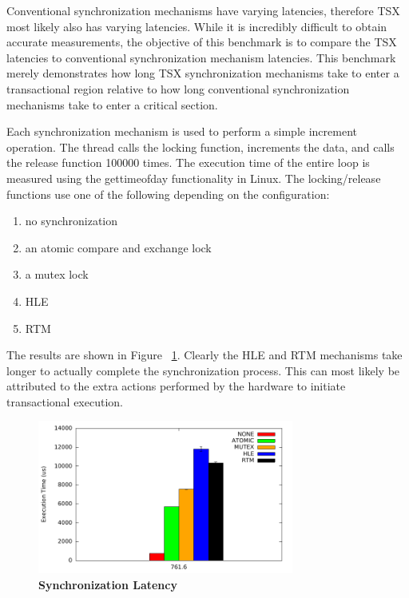 \documentclass[11pt]{book}
\begin{document}
Conventional synchronization mechanisms have varying latencies, therefore TSX most likely
also has varying latencies.  While it is incredibly difficult to obtain accurate
measurements, the objective of this benchmark is to compare the TSX latencies to conventional
synchronization mechanism latencies.  This benchmark merely demonstrates how
long TSX synchronization mechanisms take to enter a transactional region relative to how
long conventional synchronization mechanisms take to enter a critical section.

Each synchronization mechanism is used to perform a simple increment operation.
The thread calls the locking function, increments the data, and calls the release
function 100000 times.  The execution time of the entire loop is
measured using the gettimeofday functionality in Linux.  The locking/release
functions use one of the following depending on the configuration: 

\begin{enumerate}
  \item no synchronization 
  \item an atomic compare and exchange lock
  \item a mutex lock
  \item HLE
  \item RTM
\end{enumerate}

The results are shown in Figure ~\ref{fig:tsx_latency}.  Clearly the HLE and RTM
mechanisms take longer to actually complete the synchronization process.  This can most
likely be attributed to the extra actions performed by the hardware to initiate
transactional execution.

\begin{figure}[H]
    \centering
    \graphicspath{ {./figures/} }
    \includegraphics[width=0.75\textwidth,keepaspectratio]{SyncBM}
    \caption{\textbf{Synchronization Latency}}
    \label{fig:tsx_latency}
\end{figure}
\end{document}
